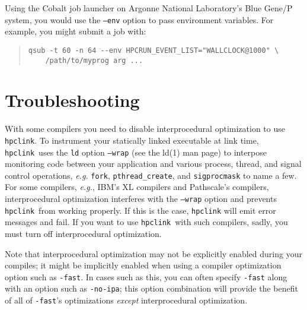 \documentclass[12pt]{article}
\newcommand{\hpclink}{\texttt{hpclink}}
\begin{document}
Using the Cobalt job launcher on Argonne National Laboratory's Blue Gene/P system, you would use  the {\tt --env} option to pass environment
variables.  For example, you might submit a job with:

\begin{quote}
\begin{verbatim}
qsub -t 60 -n 64 --env HPCRUN_EVENT_LIST="WALLCLOCK@1000" \
    /path/to/myprog arg ...
\end{verbatim}
\end{quote}

\section{Troubleshooting}

With some compilers you need to disable interprocedural
optimization to use \hpclink.  To instrument your statically linked executable at link time, \hpclink\ uses the
 {\tt ld} option {\tt --wrap} (see the ld(1) man page) to interpose monitoring code between your application and various process, thread, and signal control operations, {\em e.g.}  {\tt fork},  {\tt pthread\_create}, and {\tt sigprocmask} to name a few. For some compilers, {\em e.g.}, IBM's XL compilers and Pathscale's compilers,
interprocedural optimization interferes with the {\tt --wrap} option
and prevents \hpclink\ from working properly. If this is the case, \hpclink{} will emit error messages and fail. If you want to use \hpclink\ with such compilers, sadly, you must turn off interprocedural optimization. 

Note that interprocedural optimization may not be explicitly enabled during your compiles; it might be implicitly enabled when using a compiler optimization option such as {\tt -fast}. In cases such as this, you can often specify {\tt -fast} along with an option such as {\tt -no-ipa}; this option combination will provide the benefit of all of {\tt -fast}'s optimizations {\em except} interprocedural optimization.
\end{document}
